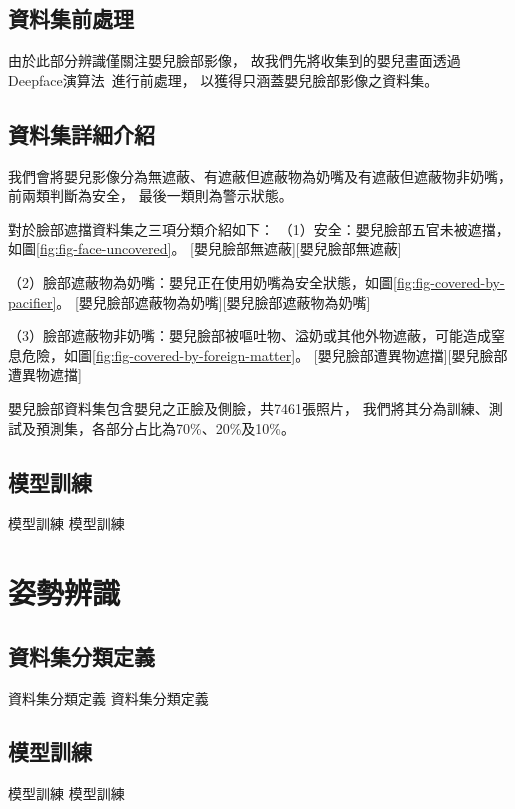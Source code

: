 \documentclass[class=NCU_thesis, crop=false]{standalone}
\begin{document}
\subsection{資料集前處理}
由於此部分辨識僅關注嬰兒臉部影像，
故我們先將收集到的嬰兒畫面透過Deepface演算法~\cite{taigmanDeepFaceUsing2014}進行前處理，
以獲得只涵蓋嬰兒臉部影像之資料集。

\subsection{資料集詳細介紹}
我們會將嬰兒影像分為無遮蔽、有遮蔽但遮蔽物為奶嘴及有遮蔽但遮蔽物非奶嘴，
前兩類判斷為安全，
最後一類則為警示狀態。

對於臉部遮擋資料集之三項分類介紹如下：
（1）安全：嬰兒臉部五官未被遮擋，如圖\cref{fig:fig-face-uncovered}。
[嬰兒臉部無遮蔽][嬰兒臉部無遮蔽]

（2）臉部遮蔽物為奶嘴：嬰兒正在使用奶嘴為安全狀態，如圖\cref{fig:fig-covered-by-pacifier}。
[嬰兒臉部遮蔽物為奶嘴][嬰兒臉部遮蔽物為奶嘴]

（3）臉部遮蔽物非奶嘴：嬰兒臉部被嘔吐物、溢奶或其他外物遮蔽，可能造成窒息危險，如圖\cref{fig:fig-covered-by-foreign-matter}。
[嬰兒臉部遭異物遮擋][嬰兒臉部遭異物遮擋]

嬰兒臉部資料集包含嬰兒之正臉及側臉，共7461張照片，
我們將其分為訓練、測試及預測集，各部分占比為70\%、20\%及10\%。

\subsection{模型訓練}
模型訓練 模型訓練

\section{姿勢辨識}
\subsection{資料集分類定義}
資料集分類定義 資料集分類定義

\subsection{模型訓練}
模型訓練 模型訓練
\end{document}

